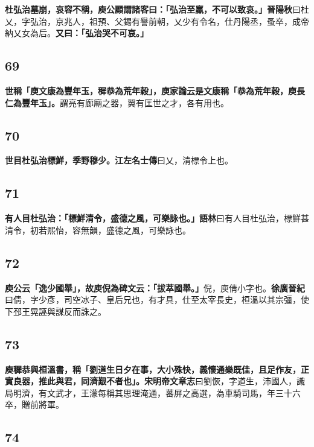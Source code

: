 \textbf{杜弘治墓崩，哀容不稱，庾公顧謂諸客曰：「弘治至羸，不可以致哀。」}{\footnotesize \textbf{晉陽秋}曰杜乂，字弘治，京兆人，祖預、父錫有譽前朝，乂少有令名，仕丹陽丞，蚤卒，成帝納乂女為后。}\textbf{又曰：「弘治哭不可哀。」}

\subsection*{69}

\textbf{世稱「庾文康為豐年玉，穉恭為荒年穀」，庾家論云是文康稱「恭為荒年穀，庾長仁為豐年玉」。}{\footnotesize 謂亮有廊廟之器，翼有匡世之才，各有用也。}

\subsection*{70}

\textbf{世目杜弘治標鮮，季野穆少。}{\footnotesize \textbf{江左名士傳}曰乂，清標令上也。}

\subsection*{71}

\textbf{有人目杜弘治：「標鮮清令，盛德之風，可樂詠也。」}{\footnotesize \textbf{語林}曰有人目杜弘治，標鮮甚清令，初若熙怡，容無韻，盛德之風，可樂詠也。}

\subsection*{72}

\textbf{庾公云「逸少國舉」，故庾倪為碑文云：「拔萃國舉。」}{\footnotesize 倪，庾倩小字也。\textbf{徐廣晉紀}曰倩，字少彥，司空冰子、皇后兄也，有才具，仕至太宰長史，桓溫以其宗彊，使下邳王晃誣與謀反而誅之。}

\subsection*{73}

\textbf{庾穉恭與桓溫書，稱「劉道生日夕在事，大小殊快，義懷通樂既佳，且足作友，正實良器，推此與君，同濟艱不者也」。}{\footnotesize \textbf{宋明帝文章志}曰劉恢，字道生，沛國人，識局明濟，有文武才，王濛每稱其思理淹通，蕃屏之高選，為車騎司馬，年三十六卒，贈前將軍。}

\subsection*{74}

